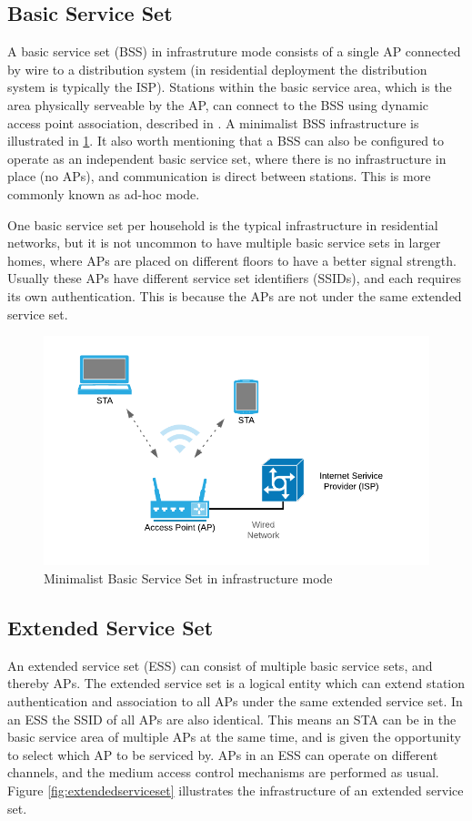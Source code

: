 		\subsection{Basic Service Set}
		A basic service set (BSS) in infrastruture mode consists of a single AP connected by wire to a distribution system (in residential deployment the distribution system is typically the ISP).
		Stations within the basic service area, which is the area physically serveable by the AP, can connect to the BSS using dynamic access point association, described
		in \cite{std80211}. A minimalist BSS infrastructure is illustrated in \ref{fig:basicserviceset}. It also worth mentioning that a BSS can also be configured to operate as an independent
		basic service set, where there is no infrastructure in place (no APs), and communication is direct between stations. This is more commonly known as ad-hoc mode.
		
		One basic service set per household is the typical infrastructure in residential networks, but it is not uncommon to have multiple basic service sets in larger homes,
		where APs are placed on different floors to have a better signal strength. Usually these APs have different service set identifiers (SSIDs), and each requires its own authentication.
		This is because the APs are not under the same extended service set. 

		 \begin{figure}
			 \center
			 \includegraphics[scale=1]{Images/BSS.png}
			 \caption{Minimalist Basic Service Set in infrastructure mode}
			 \label{fig:basicserviceset}
		 \end{figure}

		\subsection{Extended Service Set}
		An extended service set (ESS) can consist of multiple basic service sets, and thereby APs. The extended service set is a logical entity which can extend station
		authentication and association to all APs under the same extended service set. In an ESS the SSID of all APs are also identical. This means an STA can be in the basic service area of
		multiple APs at the same time, and is given the opportunity to select which AP to be serviced by. APs in an ESS can operate on different channels, and the medium access control
		mechanisms are performed as usual. Figure \ref{fig:extendedserviceset} illustrates the infrastructure of an extended service set.  

